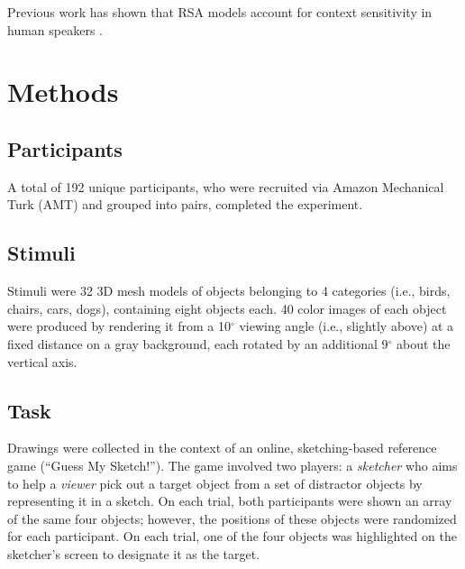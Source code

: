 \documentclass[9pt,twocolumn,twoside]{pnas-new}
\begin{document}
Previous work has shown that RSA models account for context sensitivity in human speakers \cite[]{GrafEtAl16_BasicLevel}. 


\section*{Methods}

\subsection*{Participants}

A total of 192 unique participants, who were recruited via Amazon Mechanical Turk (AMT) and grouped into pairs, completed the experiment. 

\subsection*{Stimuli}

Stimuli were 32 3D mesh models of objects belonging to 4 categories (i.e., birds, chairs, cars, dogs), containing eight objects each. 40 color images of each object were produced by rendering it from a 10$^{\circ}$ viewing angle (i.e., slightly above) at a fixed distance on a gray background, each rotated by an additional 9$^{\circ}$ about the vertical axis. 

\subsection*{Task}

Drawings were collected in the context of an online, sketching-based reference game (``Guess My Sketch!''). The game involved two players: a \textit{sketcher} who aims to help a \textit{viewer} pick out a target object from a set of distractor objects by representing it in a sketch. On each trial, both participants were shown an array of the same four objects; however, the positions of these objects were randomized for each participant. On each trial, one of the four objects was highlighted on the sketcher's screen to designate it as the target. 
\end{document}
